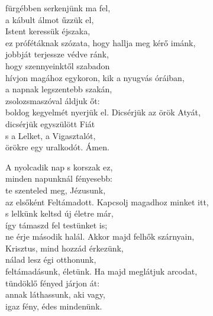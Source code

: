 \documentclass[twoside]{article}
\begin{document}
\begin{hymnstanzas}
    fürgébben serkenjünk ma fel,\\
    a kábult álmot űzzük el,\\
    Istent keressük éjszaka,\\
    ez prófétáknak szózata,
\stanzabreak
    hogy hallja meg kérő imánk,\\
    jobbját terjessze védve ránk,\\
    hogy szennyeinktől szabadon\\
    hívjon magához egykoron,
\stanzabreak
    kik a nyugvás óráiban,\\
    a napnak legszentebb szakán,\\
    zsolozsmaszóval áldjuk őt:\\
    boldog kegyelmét nyerjük el.
\stanzabreak
    Dicsérjük az örök Atyát,\\
    dicsérjük egyszülött Fiát\\
    s a Lelket, a Vigasztalót,\\
    örökre egy uralkodót. Ámen.
\end{hymnstanzas}
\begin{hymnstanzas}
    A nyolcadik nap s korszak ez,\\
    minden napunknál fényesebb:\\
    te szenteled meg, Jézusunk,\\
    az elsőként Feltámadott.
\stanzabreak
    Kapcsolj magadhoz minket itt,\\
    s lelkünk keltsd új életre már,\\
    így támaszd fel testünket is;\\
    ne érje második halál.
\stanzabreak
    Akkor majd felhők szárnyain,\\
    Krisztus, mind hozzád érkezünk,\\
    nálad lesz égi otthonunk,\\
    feltámadásunk, életünk.
\stanzabreak
    Ha majd meglátjuk arcodat,\\
    tündöklő fényed járjon át:\\
    annak láthassunk, aki vagy,\\
    igaz fény, édes mindenünk.
\end{hymnstanzas}
\end{document}
